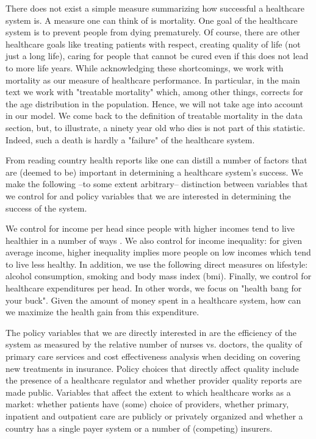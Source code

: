 \documentclass{article}
\begin{document}
There does not exist a simple measure summarizing how successful a healthcare system is. A measure one can think of is mortality. One goal of the healthcare system is to prevent people from dying prematurely. Of course, there are other healthcare goals like treating patients with respect, creating quality of life (not just a long life), caring for people that cannot be cured even if this does not lead to more life years. While acknowledging these shortcomings, we work with mortality as our measure of healthcare performance. In particular, in the main text we work with "treatable mortality" which, among other things, corrects for the age distribution in the population. Hence, we will not take age into account in our model. We come back to the definition of treatable mortality in the data section, but, to illustrate, a ninety year old who dies is not part of this statistic. Indeed, such a death is hardly a "failure" of the healthcare system. 

From reading country health reports like \cite{countryprofileUK} one can distill a number of factors that are (deemed to be) important in determining a healthcare system's success. We make the following --to some extent arbitrary-- distinction between variables that we control for and policy variables that we are interested in determining the success of the system.

We control for income per head since people with higher incomes tend to live healthier in a number of ways \citep{socioeconomicstatus}. We also control for income inequality: for given average income, higher inequality implies more people on low incomes which tend to live less healthy. In addition, we use the following direct measures on lifestyle: alcohol consumption, smoking and body mass index (bmi). Finally, we control for healthcare expenditures per head. In other words, we focus on "health bang for your buck". Given the amount of money spent in a healthcare system, how can we maximize the health gain from this expenditure.

The policy variables that we are directly interested in are the efficiency of the system as measured by the relative number of nurses vs. doctors, the quality of primary care services and cost effectiveness analysis when deciding on covering new treatments in insurance. Policy choices that directly affect quality include the presence of a healthcare regulator and whether provider quality reports are made public. Variables that affect the extent to which healthcare works as a market: whether patients have (some) choice of providers, whether primary, inpatient and outpatient care are publicly or privately organized and whether a country has a single payer system or a number of (competing) insurers.
\end{document}
